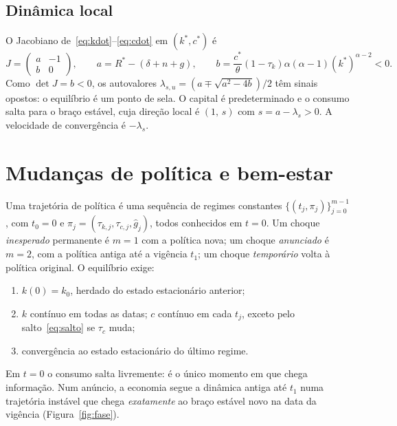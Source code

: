 \documentclass[11pt,a4paper]{article}
\begin{document}
\subsection{Dinâmica local}
O Jacobiano de~\eqref{eq:kdot}--\eqref{eq:cdot} em $(k^*,c^*)$ é
\begin{equation}
 J=\begin{pmatrix} a&-1\\ b&0\end{pmatrix},\qquad
 a=R^*-(\delta+n+g),\qquad
 b=\frac{c^*}{\theta}(1-\tau_k)\alpha(\alpha-1)(k^*)^{\alpha-2}<0.
 \label{eq:jacobiano}
\end{equation}
Como $\det J=b<0$, os autovalores $\lambda_{s,u}=(a\mp\sqrt{a^2-4b})/2$ têm sinais
opostos: o equilíbrio é um ponto de sela. O capital é predeterminado e o consumo
salta para o braço estável, cuja direção local é $(1,\,s)$ com $s=a-\lambda_s>0$.
A velocidade de convergência é $-\lambda_s$.

\section{Mudanças de política e bem-estar}
\label{sec:politica}

Uma trajetória de política é uma sequência de regimes constantes
$\{(t_j,\pi_j)\}_{j=0}^{m-1}$, com $t_0=0$ e $\pi_j=(\tau_{k,j},\tau_{c,j},\hat g_j)$,
todos conhecidos em $t=0$. Um choque \emph{inesperado} permanente é $m=1$ com a
política nova; um choque \emph{anunciado} é $m=2$, com a política antiga até a
vigência $t_1$; um choque \emph{temporário} volta à política original. O
equilíbrio exige:
\begin{enumerate}
 \item $k(0)=k_0$, herdado do estado estacionário anterior;
 \item $k$ contínuo em todas as datas; $c$ contínuo em cada $t_j$, exceto pelo
 salto~\eqref{eq:salto} se $\tau_c$ muda;
 \item convergência ao estado estacionário do último regime.
\end{enumerate}
Em $t=0$ o consumo salta livremente: é o único momento em que chega informação.
Num anúncio, a economia segue a dinâmica antiga até $t_1$ numa trajetória
instável que chega \emph{exatamente} ao braço estável novo na data da
vigência (Figura~\ref{fig:fase}).
\end{document}
